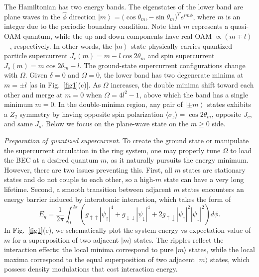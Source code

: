 \documentclass[twocolumn,prl,floatfix,citeautoscript,nofootinbib]{revtex4-1}
\begin{document}
The Hamiltonian has two energy bands. The eigenstates of the lower band are
plane waves in the $\hat{\phi}$ direction $\left\vert m\right\rangle ={(\cos
\theta _{m},-\sin \theta _{m}{)^{T}}{e^{im\phi }}}$, where $m$ is an integer
due to the periodic boundary condition. Note that $m$ represents a quasi-OAM
quantum, while the up and down components have real OAM $\propto (m\mp l)$~%
\cite{Sun2015}, respectively. In other words, the $\left\vert m\right\rangle
$ state physically carries quantized particle supercurrent $J_{c}(m)=m-l\cos
2\theta _{m}$ and spin supercurrent $J_{s}(m)=m\cos 2\theta _{m}-l$. The
ground-state supercurrent configurations change with $\Omega $. Given $%
\delta =0$ and $\Omega =0$, the lower band has two degenerate minima at $%
m=\pm l$ [as in Fig.~\ref{fig1}(c)]. As $\Omega $ increases, the double
minima shift toward each other and merge at $m=0$ when $\Omega =4l^{2}-1$,
above which the band has a single minimum $m=0$. In the double-minima
region, any pair of $\left\vert \pm m\right\rangle $ states exhibits a $Z_{2}
$ symmetry by having opposite spin polarization $\langle \sigma _{z}\rangle
=\cos 2\theta _{m}$, opposite $J_{c}$, and same $J_{s}$. Below we focus on
the plane-wave state on the $m\geq 0$ side.

\emph{Preparation of quantized supercurrent}. To create the ground state or
manipulate the supercurrent circulation in the ring system, one may properly
tune $\Omega $ to load the BEC at a desired quantum $m$, as it naturally
pursuits the energy minimum. However, there are two issues preventing this.
First, all $m$ states are stationary states and do not couple to each other,
so a high-$m$ state can have a very long lifetime. Second, a smooth
transition between adjacent $m$ states encounters an energy barrier induced
by interatomic interaction, which takes the form of
\begin{equation}
E_{g}=\frac{1}{2\pi }\int_{0}^{2\pi }\left( g_{\uparrow \uparrow }|\psi
_{\uparrow }|^{4}+g_{\downarrow \downarrow }|\psi _{\downarrow
}|^{4}+2g_{\uparrow \downarrow }|\psi _{\uparrow }|^{2}|\psi _{\downarrow
}|^{2}\right) d\phi .
\end{equation}%
In Fig.~\ref{fig1}(c), we schematically plot the system energy vs
expectation value of $m$ for a superposition of two adjacent $|m\rangle $
states. The ripples reflect the interaction effects: the local minima
correspond to pure $|m\rangle $ states, while the local maxima correspond to
the equal superposition of two adjacent $|m\rangle $ states, which possess
density modulations that cost interaction energy.
\end{document}
